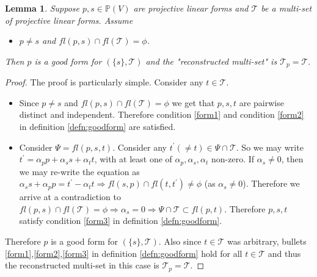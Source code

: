 \documentclass[12pt]{caltech_thesis}
\theoremstyle{plain}
\newtheorem{lemma}{Lemma}
\theoremstyle{definition}
\newcommand{\MT}{\mathcal{T}}
\newcommand{\PP}{\mathbb{P}}
\begin{document}
\begin{lemma}\label{lemma:goodformsapplication}
 Suppose $p,s \in \PP(V)$ are projective linear forms and $\MT$ be a multi-set of projective linear forms.
 Assume
 \begin{itemize}
   \renewcommand\labelitemi{--}
  \item $p\neq s$ and $fl(p,s)\cap fl(\MT) = \phi$.
 \end{itemize}
Then $p$ is a good form for $(\{s\},\MT)$ and the \emph{"reconstructed multi-set"} is $\MT_{p} = \MT.$ 
\end{lemma}
\begin{proof}
 The proof is particularly simple. Consider any $t\in \MT$. 
 \begin{itemize}
  \item Since $p\neq s$ and $fl(p,s)\cap fl(\MT) = \phi$ we get that $p,s,t$ are pairwise distinct and independent. Therefore condition \ref{form1}
  and condition \ref{form2} in definition \ref{defn:goodform} are satisfied.
  \item Consider $\Psi = fl(p,s,t)$. Consider any $t^\prime (\neq t) \in \Psi \cap \MT$. So we may write $t^\prime = \alpha_p p + \alpha_s s + \alpha_t t$,
  with at least one of $\alpha_p,\alpha_s,\alpha_t$ non-zero. If $\alpha_s \neq 0$, then we may re-write the equation as 
  $\alpha_s s + \alpha_p p = t^\prime -\alpha_t t \Rightarrow fl(s,p)\cap fl(t,t^\prime)\neq \phi$ (as $\alpha_s\neq 0$). Therefore
  we arrive at a contradiction to $fl(p,s)\cap fl(\MT) = \phi \Rightarrow \alpha_s = 0\Rightarrow \Psi \cap \MT \subset fl(p,t)$. Therefore
  $p,s,t$ satisfy condition \ref{form3} in definition \ref{defn:goodform}.
 \end{itemize}
Therefore $p$ is a good form for $(\{s\},\MT)$. Also since $t\in \MT$ was arbitrary, bullets \ref{form1},\ref{form2},\ref{form3} in definition 
\ref{defn:goodform} hold for all $t\in \MT$ and thus the reconstructed multi-set in this case is $\MT_{p} = \MT$.
\end{proof}
\end{document}
